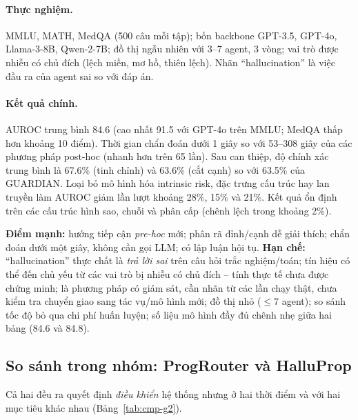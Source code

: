 \paragraph{Thực nghiệm.} MMLU, MATH, MedQA (500 câu mỗi tập); bốn backbone GPT-3.5, GPT-4o, Llama-3-8B, Qwen-2-7B; đồ thị ngẫu nhiên với 3--7 agent, 3 vòng; vai trò được nhiễu có chủ đích (lệch miền, mơ hồ, thiên lệch). Nhãn ``hallucination'' là việc đầu ra của agent sai so với đáp án.

\paragraph{Kết quả chính.} AUROC trung bình 84.6 (cao nhất 91.5 với GPT-4o trên MMLU; MedQA thấp hơn khoảng 10 điểm). Thời gian chẩn đoán dưới 1 giây so với 53--308 giây của các phương pháp post-hoc (nhanh hơn trên 65 lần). Sau can thiệp, độ chính xác trung bình là 67.6\% (tinh chỉnh) và 63.6\% (cắt cạnh) so với 63.5\% của GUARDIAN. Loại bỏ mô hình hóa intrinsic risk, đặc trưng cấu trúc hay lan truyền làm AUROC giảm lần lượt khoảng 28\%, 15\% và 21\%. Kết quả ổn định trên các cấu trúc hình sao, chuỗi và phân cấp (chênh lệch trong khoảng 2\%).

\begin{nhanxet}
\textbf{Điểm mạnh:} hướng tiếp cận \emph{pre-hoc} mới; phân rã đỉnh/cạnh dễ giải thích; chẩn đoán dưới một giây, không cần gọi LLM; có lập luận hội tụ. \textbf{Hạn chế:} ``hallucination'' thực chất là \emph{trả lời sai} trên câu hỏi trắc nghiệm/toán; tín hiệu có thể đến chủ yếu từ các vai trò bị nhiễu có chủ đích -- tính thực tế chưa được chứng minh; là phương pháp có giám sát, cần nhãn từ các lần chạy thật, chưa kiểm tra chuyển giao sang tác vụ/mô hình mới; đồ thị nhỏ ($\le 7$ agent); so sánh tốc độ bỏ qua chi phí huấn luyện; số liệu mô hình đầy đủ chênh nhẹ giữa hai bảng (84.6 và 84.8).
\end{nhanxet}


\subsection{So sánh trong nhóm: ProgRouter và HalluProp}
\label{sec:cmp-orch}

Cả hai đều ra quyết định \emph{điều khiển} hệ thống nhưng ở hai thời điểm và với hai mục tiêu khác nhau (Bảng~\ref{tab:cmp-g2}).

